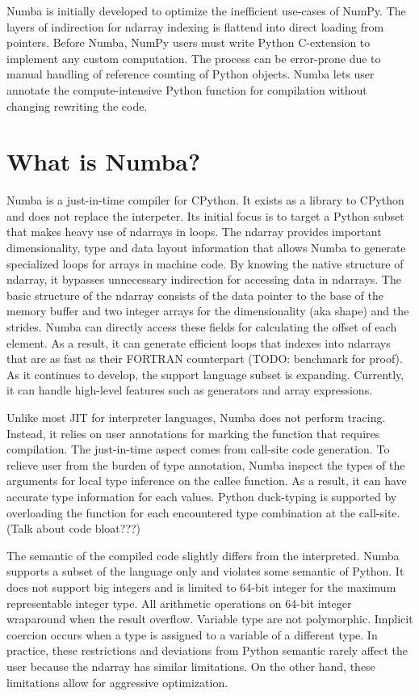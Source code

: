 \documentclass{acm_proc_article-sp}
\begin{document}
Numba is initially developed to optimize the inefficient use-cases of NumPy.
The layers of indirection for ndarray indexing is flattend into direct loading
from pointers.  Before Numba, NumPy users must write Python C-extension to
implement any custom computation.  The process can be error-prone due to manual
handling of reference counting of Python objects. Numba lets user annotate
the compute-intensive Python function for compilation without changing rewriting
the code.

\section{What is Numba?}

Numba is a just-in-time compiler for CPython.
It exists as a library to CPython and does not replace the interpeter.
Its initial focus is to target a Python subset that makes heavy use of
ndarrays in loops.  The ndarray provides important dimensionality,
type and data layout information that allows Numba to generate specialized
loops for arrays in machine code. By knowing the native structure of ndarray,
it bypasses unnecessary indirection for accessing data in ndarrays.
The basic structure of the ndarray consists of the data pointer to the base of
the memory buffer and two integer arrays for the dimensionality (aka shape) and
the strides. Numba can directly access these fields for calculating the offset
of each element.  As a result, it can generate efficient loops that indexes
into ndarrays that are as fast as their FORTRAN counterpart
(TODO: benchmark for proof). As it continues to develop, the support language
subset is expanding. Currently, it can handle high-level features such as
generators and array expressions.

Unlike most JIT for interpreter languages, Numba does not perform tracing.
Instead, it relies on user annotations for marking the function that requires
compilation. The just-in-time aspect comes from call-site code generation.
To relieve user from the burden of type annotation, Numba inspect the types
of the arguments for local type inference on the callee function.
As a result, it can have accurate type information for each values.
Python duck-typing is supported by overloading the function for each
encountered type combination at the call-site. (Talk about code bloat???)

The semantic of the compiled code slightly differs
from the interpreted. Numba supports a subset of the language only
and violates some semantic of Python.  It does not support big integers
and is limited to 64-bit integer for the maximum representable integer type.
All arithmetic operations on 64-bit integer wraparound when the result
overflow.  Variable type are not polymorphic.  Implicit coercion occurs when
a type is assigned to a variable of a different type. In practice, these
restrictions and deviations from Python semantic rarely affect the user
because the ndarray has similar limitations. On the other hand, these
limitations allow for aggressive optimization.
\end{document}
